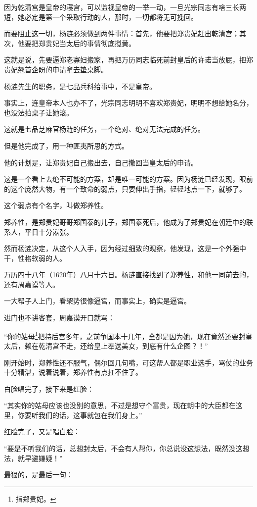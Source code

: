 \begin{multicols}{\theparacolNo}
因为乾清宫是皇帝的寝宫，可以监视皇帝的一举一动，一旦光宗同志有啥三长两短，她必定是第一个采取行动的人，那时，一切都将无可挽回。

而要阻止这一切，杨涟必须做到两件事情：首先，他要把郑贵妃赶出乾清宫；其次，他要把郑贵妃当太后的事情彻底搅黄。

这就是说，先要逼郑老寡妇搬家，再把万历同志临死前封皇后的许诺当放屁，把郑贵妃翘首企盼的申请拿去垫桌脚。

杨涟先生的职务，是七品兵科给事中，不是皇帝。

事实上，连皇帝本人也办不了，光宗同志明明不喜欢郑贵妃，明明不想给她名分，也没法拍桌子让她滚。

这就是七品芝麻官杨涟的任务，一个绝对、绝对无法完成的任务。

但是他完成了，用一种匪夷所思的方式。

他的计划是，让郑贵妃自己搬出去，自己撤回当皇太后的申请。

这是一个看上去绝不可能的方案，却是唯一可能的方案。因为杨涟已经发现，眼前的这个庞然大物，有一个致命的弱点，只要伸出手指，轻轻地点一下，就够了。

这个弱点有个名字，叫做郑养性。

郑养性，是郑贵妃哥哥郑国泰的儿子，郑国泰死后，他成为了郑贵妃在朝廷中的联系人，平日十分嚣张。

然而杨涟决定，从这个人入手，因为经过细致的观察，他发现，这是一个外强中干，性格软弱的人。

万历四十八年（1620年）八月十六日。杨涟直接找到了郑养性，和他一同前去的，还有周嘉谟等人。

一大帮子人上门，看架势很像逼宫，而事实上，确实是逼宫。

进门也不讲客套，周嘉谟开口就骂：

“你的姑母\footnote{指郑贵妃。}把持后宫多年，之前争国本十几年，全都是因为她，现在竟然还要封皇太后，赖在乾清宫不走，还给皇上奉送美女，到底有什么企图？！”

刚开始时，郑养性还不服气，偶尔回几句嘴，可这帮人都是职业选手，骂仗的业务十分精湛，说着说着，郑养性有点扛不住了。

白脸唱完了，接下来是红脸：

“其实你的姑母应该也没别的意思，不过是想守个富贵，现在朝中的大臣都在这里，你要听我们的话，这事就包在我们身上。”

红脸完了，又是唱白脸：

“要是不听我们的话，总想封太后，不会有人帮你，你总说没这想法，既然没这想法，就早避嫌疑！”

最狠的，是最后一句：


\end{multicols}
